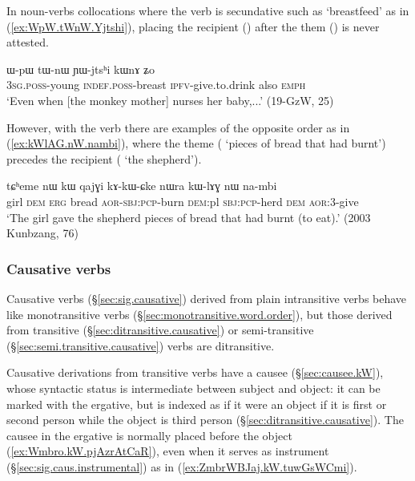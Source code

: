 In noun-verbs collocations where the verb is secundative such as  `breastfeed' as in (\ref{ex:WpW.tWnW.Yjtshi}), placing the recipient () after the them () is never attested.

\begin{exe}
\ex \label{ex:WpW.tWnW.Yjtshi}
\gll ɯ-pɯ tɯ-nɯ ɲɯ-jtsʰi kɯnɤ ʑo \\
\textsc{3sg}.\textsc{poss}-young \textsc{indef}.\textsc{poss}-breast \textsc{ipfv}-give.to.drink also \textsc{emph} \\
\glt `Even when [the monkey mother] nurses her baby,...' (19-GzW, 25)
\end{exe}


However, with the verb  there are examples of the opposite order as in (\ref{ex:kWlAG.nW.nambi}), where the theme ( `pieces of bread that had burnt') precedes the recipient ( `the shepherd').


\begin{exe}
\ex \label{ex:kWlAG.nW.nambi}
\gll  tɕʰeme nɯ kɯ qajɣi kɤ-kɯ-ɕke nɯra kɯ-lɤɣ nɯ na-mbi \\
girl \textsc{dem} \textsc{erg} bread \textsc{aor}-\textsc{sbj}:\textsc{pcp}-burn \textsc{dem}:pl \textsc{sbj}:\textsc{pcp}-herd \textsc{dem} \textsc{aor}:3\flobv{}-give \\
\glt `The girl gave the shepherd pieces of bread that had burnt (to eat).' (2003 Kunbzang, 76)
\end{exe}

\subsubsection{Causative verbs} \label{sec:causative.word.order}
Causative verbs (§\ref{sec:sig.causative}) derived from plain intransitive verbs behave like monotransitive verbs (§\ref{sec:monotransitive.word.order}), but those derived from transitive (§\ref{sec:ditransitive.causative}) or semi-transitive (§\ref{sec:semi.transitive.causative}) verbs are ditransitive.

Causative derivations from transitive verbs have a causee (§\ref{sec:causee.kW}), whose syntactic status is intermediate between subject and object: it can be marked with the ergative, but is indexed as if it were an object if it is first or second person while the object is third person (§\ref{sec:ditransitive.causative}). The causee in the ergative is normally placed before the object (\ref{ex:Wmbro.kW.pjAzrAtCaR}), even when it serves as instrument (§\ref{sec:sig.caus.instrumental}) as in (\ref{ex:ZmbrWBJaj.kW.tuwGsWCmi}).


